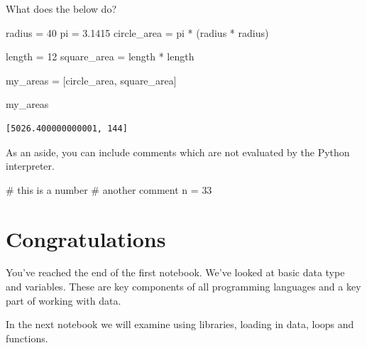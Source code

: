 \documentclass[
  letterpaper,
  DIV=11,
  numbers=noendperiod]{scrreprt}
\newenvironment{Shaded}{\begin{snugshade}}{\end{snugshade}}
\newcommand{\CommentTok}[1]{\textcolor[rgb]{0.37,0.37,0.37}{#1}}
\newcommand{\DecValTok}[1]{\textcolor[rgb]{0.68,0.00,0.00}{#1}}
\newcommand{\FloatTok}[1]{\textcolor[rgb]{0.68,0.00,0.00}{#1}}
\newcommand{\NormalTok}[1]{\textcolor[rgb]{0.00,0.23,0.31}{#1}}
\newcommand{\OperatorTok}[1]{\textcolor[rgb]{0.37,0.37,0.37}{#1}}
\begin{document}
What does the below do?

\begin{Shaded}
\begin{Highlighting}[]
\NormalTok{radius }\OperatorTok{=} \DecValTok{40}
\NormalTok{pi }\OperatorTok{=} \FloatTok{3.1415}
\NormalTok{circle\_area }\OperatorTok{=}\NormalTok{ pi }\OperatorTok{*}\NormalTok{ (radius }\OperatorTok{*}\NormalTok{ radius)}

\NormalTok{length }\OperatorTok{=} \DecValTok{12}
\NormalTok{square\_area }\OperatorTok{=}\NormalTok{ length }\OperatorTok{*}\NormalTok{ length}

\NormalTok{my\_areas }\OperatorTok{=}\NormalTok{ [circle\_area, square\_area]}
\end{Highlighting}
\end{Shaded}

\begin{Shaded}
\begin{Highlighting}[]
\NormalTok{my\_areas}
\end{Highlighting}
\end{Shaded}

\begin{verbatim}
[5026.400000000001, 144]
\end{verbatim}

As an aside, you can include comments which are not evaluated by the
Python interpreter.

\begin{Shaded}
\begin{Highlighting}[]
\CommentTok{\# this is a number}
\CommentTok{\# another comment}
\NormalTok{n }\OperatorTok{=} \DecValTok{33}
\end{Highlighting}
\end{Shaded}


\hypertarget{congratulations}{%
\chapter{Congratulations}\label{congratulations}}

You've reached the end of the first notebook. We've looked at basic data
type and variables. These are key components of all programming
languages and a key part of working with data.

In the next notebook we will examine using libraries, loading in data,
loops and functions.

\end{document}
